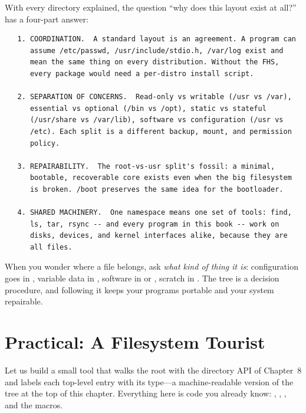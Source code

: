 With every directory explained, the question ``why does this layout
exist at all?'' has a four-part answer:

\begin{verbatim}
   1. COORDINATION.  A standard layout is an agreement. A program can
      assume /etc/passwd, /usr/include/stdio.h, /var/log exist and
      mean the same thing on every distribution. Without the FHS,
      every package would need a per-distro install script.

   2. SEPARATION OF CONCERNS.  Read-only vs writable (/usr vs /var),
      essential vs optional (/bin vs /opt), static vs stateful
      (/usr/share vs /var/lib), software vs configuration (/usr vs
      /etc). Each split is a different backup, mount, and permission
      policy.

   3. REPAIRABILITY.  The root-vs-usr split's fossil: a minimal,
      bootable, recoverable core exists even when the big filesystem
      is broken. /boot preserves the same idea for the bootloader.

   4. SHARED MACHINERY.  One namespace means one set of tools: find,
      ls, tar, rsync -- and every program in this book -- work on
      disks, devices, and kernel interfaces alike, because they are
      all files.
\end{verbatim}

\begin{ruleofthumb}
When you wonder where a file belongs, ask \emph{what kind of thing it
is}: configuration goes in , variable data in
, software in  or , scratch in
. The tree is a decision procedure, and following it keeps
your programs portable and your system repairable.
\end{ruleofthumb}

\section{Practical: A Filesystem Tourist}

Let us build a small tool that walks the root with the directory API
of Chapter~8 and labels each top-level entry with its type---a
machine-readable version of the tree at the top of this chapter.
Everything here is code you already know: ,
, , and the  macros.

